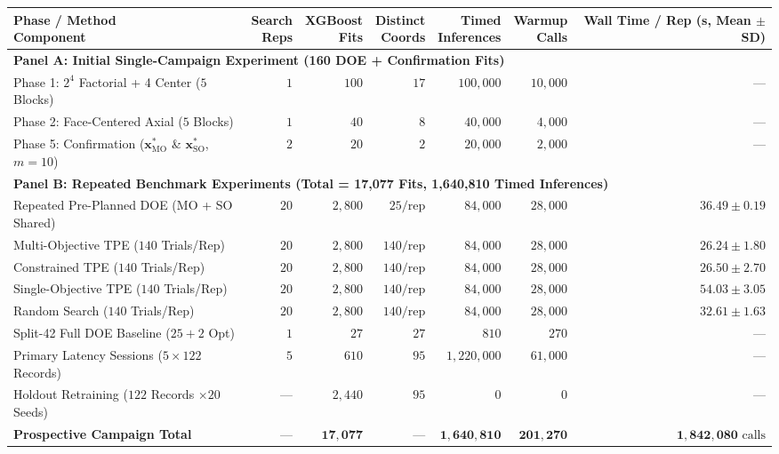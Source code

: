 \begin{tabular}{lrrrrrr}
\toprule
\makecell[l]{\textbf{Phase / Method}\\\textbf{Component}} & \makecell{\textbf{Search}\\\textbf{Reps}} & \makecell{\textbf{XGBoost}\\\textbf{Fits}} & \makecell{\textbf{Distinct}\\\textbf{Coords}} & \makecell{\textbf{Timed}\\\textbf{Inferences}} & \makecell{\textbf{Warmup}\\\textbf{Calls}} & \makecell{\textbf{Wall Time / Rep}\\\scriptsize(s, Mean $\pm$ SD)} \\
\midrule
\multicolumn{7}{l}{\textbf{Panel A: Initial Single-Campaign Experiment (160 DOE + Confirmation Fits)}} \\
Phase 1: $2^4$ Factorial + 4 Center ($5$ Blocks) & $1$ & $100$ & $17$ & $100{,}000$ & $10{,}000$ & --- \\
Phase 2: Face-Centered Axial ($5$ Blocks) & $1$ & $40$ & $8$ & $40{,}000$ & $4{,}000$ & --- \\
Phase 5: Confirmation ($\mathbf{x}^*_{\text{MO}}$ \& $\mathbf{x}^*_{\text{SO}}$, $m=10$) & $2$ & $20$ & $2$ & $20{,}000$ & $2{,}000$ & --- \\
\midrule
\multicolumn{7}{l}{\textbf{Panel B: Repeated Benchmark Experiments (Total = 17{,}077 Fits{,} 1{,}640{,}810 Timed Inferences)}} \\
Repeated Pre-Planned DOE (MO + SO Shared) & $20$ & $2{,}800$ & $25/\text{rep}$ & $84{,}000$ & $28{,}000$ & $36.49 \pm 0.19$ \\
Multi-Objective TPE ($140$ Trials/Rep) & $20$ & $2{,}800$ & $140/\text{rep}$ & $84{,}000$ & $28{,}000$ & $26.24 \pm 1.80$ \\
Constrained TPE ($140$ Trials/Rep) & $20$ & $2{,}800$ & $140/\text{rep}$ & $84{,}000$ & $28{,}000$ & $26.50 \pm 2.70$ \\
Single-Objective TPE ($140$ Trials/Rep) & $20$ & $2{,}800$ & $140/\text{rep}$ & $84{,}000$ & $28{,}000$ & $54.03 \pm 3.05$ \\
Random Search ($140$ Trials/Rep) & $20$ & $2{,}800$ & $140/\text{rep}$ & $84{,}000$ & $28{,}000$ & $32.61 \pm 1.63$ \\
Split-42 Full DOE Baseline ($25 + 2$ Opt) & $1$ & $27$ & $27$ & $810$ & $270$ & --- \\
Primary Latency Sessions ($5 \times 122$ Records) & $5$ & $610$ & $95$ & $1{,}220{,}000$ & $61{,}000$ & --- \\
Holdout Retraining ($122$ Records $\times 20$ Seeds) & --- & $2{,}440$ & $95$ & $0$ & $0$ & --- \\
\midrule
\textbf{Prospective Campaign Total} & --- & $\mathbf{17{,}077}$ & --- & $\mathbf{1{,}640{,}810}$ & $\mathbf{201{,}270}$ & $\mathbf{1{,}842{,}080}\text{ calls}$ \\
\bottomrule
\end{tabular}
